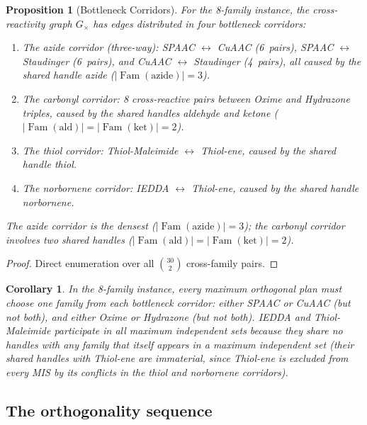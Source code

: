 \documentclass[preprint,12pt]{elsarticle}
\newtheorem{corollary}[theorem]{Corollary}
\newtheorem{proposition}[theorem]{Proposition}
\theoremstyle{definition}
\theoremstyle{remark}
\DeclareMathOperator{\Fam}{Fam}
\begin{document}
\begin{proposition}[Bottleneck Corridors]\label{prop:bottleneck}
For the 8-family instance,
the cross-reactivity graph $G_\times$ has edges distributed in
four bottleneck corridors:
\begin{enumerate}[nosep,label=(\roman*)]
\item The \emph{azide corridor} (three-way): SPAAC $\leftrightarrow$ CuAAC
  (6~pairs), SPAAC $\leftrightarrow$ Staudinger (6~pairs), and
  CuAAC $\leftrightarrow$ Staudinger (4~pairs), all caused by the
  shared handle \emph{azide} ($|\Fam(\text{azide})| = 3$).
\item The \emph{carbonyl corridor}: 8 cross-reactive pairs between
  Oxime and Hydrazone triples, caused by the shared handles
  \emph{aldehyde} and \emph{ketone}
  ($|\Fam(\text{ald})| = |\Fam(\text{ket})| = 2$).
\item The \emph{thiol corridor}: Thiol-Maleimide $\leftrightarrow$
  Thiol-ene, caused by the shared handle \emph{thiol}.
\item The \emph{norbornene corridor}: IEDDA $\leftrightarrow$
  Thiol-ene, caused by the shared handle \emph{norbornene}.
\end{enumerate}
The azide corridor is the densest ($|\Fam(\text{azide})| = 3$);
the carbonyl corridor involves two shared handles
($|\Fam(\text{ald})| = |\Fam(\text{ket})| = 2$).
\end{proposition}

\begin{proof}
Direct enumeration over all $\binom{30}{2}$ cross-family pairs.
\end{proof}

\begin{corollary}\label{cor:cuaac-excluded}
In the 8-family instance, every maximum orthogonal plan must
choose one family from each bottleneck corridor: either SPAAC
or CuAAC (but not both),
and either Oxime or Hydrazone (but not both).  IEDDA and
Thiol-Maleimide participate in all maximum independent sets
because they share no handles with any family that itself
appears in a maximum independent set (their shared handles
with Thiol-ene are immaterial, since Thiol-ene is excluded
from every MIS by its conflicts in the thiol and norbornene
corridors).
\end{corollary}


\subsection{The orthogonality sequence}
\end{document}
